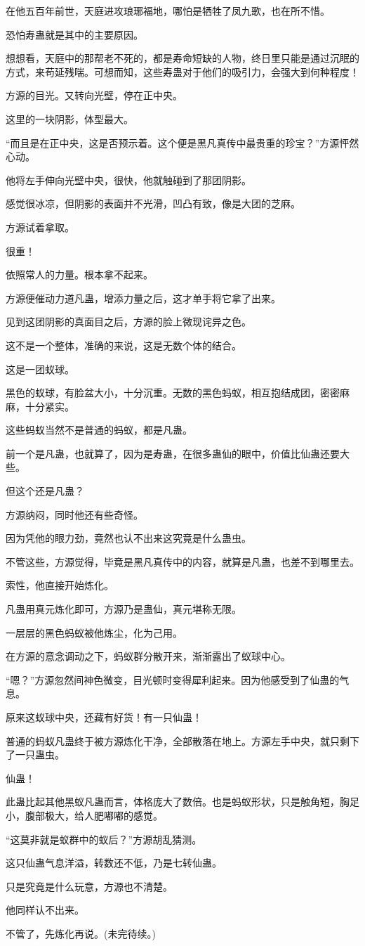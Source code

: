 \begin{this_body}
在他五百年前世，天庭进攻琅琊福地，哪怕是牺牲了凤九歌，也在所不惜。

恐怕寿蛊就是其中的主要原因。

想想看，天庭中的那帮老不死的，都是寿命短缺的人物，终日里只能是通过沉眠的方式，来苟延残喘。可想而知，这些寿蛊对于他们的吸引力，会强大到何种程度！

方源的目光。又转向光壁，停在正中央。

这里的一块阴影，体型最大。

“而且是在正中央，这是否预示着。这个便是黑凡真传中最贵重的珍宝？”方源怦然心动。

他将左手伸向光壁中央，很快，他就触碰到了那团阴影。

感觉很冰凉，但阴影的表面并不光滑，凹凸有致，像是大团的芝麻。

方源试着拿取。

很重！

依照常人的力量。根本拿不起来。

方源便催动力道凡蛊，增添力量之后，这才单手将它拿了出来。

见到这团阴影的真面目之后，方源的脸上微现诧异之色。

这不是一个整体，准确的来说，这是无数个体的结合。

这是一团蚁球。

黑色的蚁球，有脸盆大小，十分沉重。无数的黑色蚂蚁，相互抱结成团，密密麻麻，十分紧实。

这些蚂蚁当然不是普通的蚂蚁，都是凡蛊。

前一个是凡蛊，也就算了，因为是寿蛊，在很多蛊仙的眼中，价值比仙蛊还要大些。

但这个还是凡蛊？

方源纳闷，同时他还有些奇怪。

因为凭他的眼力劲，竟然也认不出来这究竟是什么蛊虫。

不管这些，方源觉得，毕竟是黑凡真传中的内容，就算是凡蛊，也差不到哪里去。

索性，他直接开始炼化。

凡蛊用真元炼化即可，方源乃是蛊仙，真元堪称无限。

一层层的黑色蚂蚁被他炼尘，化为己用。

在方源的意念调动之下，蚂蚁群分散开来，渐渐露出了蚁球中心。

“嗯？”方源忽然间神色微变，目光顿时变得犀利起来。因为他感受到了仙蛊的气息。

原来这蚁球中央，还藏有好货！有一只仙蛊！

普通的蚂蚁凡蛊终于被方源炼化干净，全部散落在地上。方源左手中央，就只剩下了一只蛊虫。

仙蛊！

此蛊比起其他黑蚁凡蛊而言，体格庞大了数倍。也是蚂蚁形状，只是触角短，胸足小，腹部极大，给人肥嘟嘟的感觉。

“这莫非就是蚁群中的蚁后？”方源胡乱猜测。

这只仙蛊气息洋溢，转数还不低，乃是七转仙蛊。

只是究竟是什么玩意，方源也不清楚。

他同样认不出来。

不管了，先炼化再说。(未完待续。)

\end{this_body}

